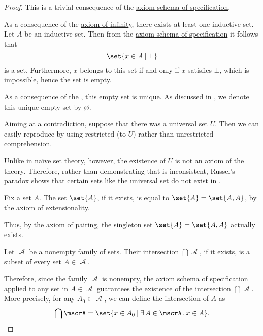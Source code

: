 \begin{proof}
   This is a trivial consequence of the \hyperref[def:zfc/specification]{axiom schema of specification}.

   As a consequence of the \hyperref[def:zfc/infinity]{axiom of infinity}, there exists at least one inductive set. Let \( A \) be an inductive set. Then from the \hyperref[def:zfc/specification]{axiom schema of specification} it follows that
  \begin{equation*}
    \set{ x \in A \given \bot }
  \end{equation*}
  is a set. Furthermore, \( x \) belongs to this set if and only if \( x \) satisfies \( \bot \), which is impossible, hence the set is empty.

  As a consequence of the , this empty set is unique. As discussed in , we denote this unique empty set by \( \varnothing \).

   Aiming at a contradiction, suppose that there was a universal set \( U \). Then we can easily reproduce  by using restricted (to \( U \)) rather than unrestricted comprehension.

  Unlike in na\"ive set theory, however, the existence of \( U \) is not an axiom of the theory. Therefore, rather than demonstrating that  is inconsistent, Russel's paradox shows that certain sets like the universal set do not exist in .

   Fix a set \( A \). The set \( \set{A} \), if it exists, is equal to \( \set{A} = \set{A, A} \), by the \hyperref[def:zfc/extensionality]{axiom of extensionality}.

  Thus, by the \hyperref[def:zfc/pairing]{axiom of pairing}, the singleton set \( \set{A} = \set{A, A} \) actually exists.

   Let \( \mscrA \) be a nonempty family of sets. Their intersection \( \bigcap \mscrA \), if it exists, is a subset of every set \( A \in \mscrA \).

  Therefore, since the family \( \mscrA \) is nonempty, the \hyperref[def:zfc/specification]{axiom schema of specification} applied to any set in \( A \in \mscrA \) guarantees the existence of the intersection \( \bigcap \mscrA \). More precisely, for any \( A_0 \in \mscrA \), we can define the intersection of \( A \) as
  \begin{equation*}
    \bigcap \mscrA = \set{ x \in A_0 \given \qexists {A \in \mscrA} x \in A }.
  \end{equation*}


\end{proof}
